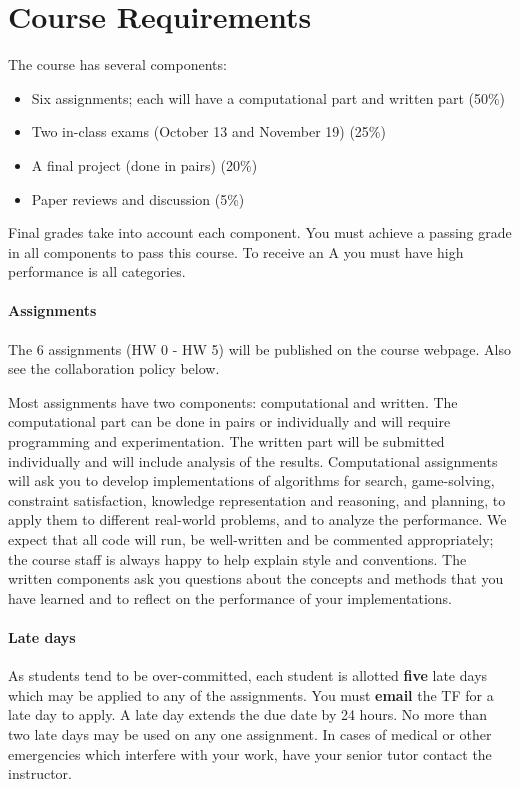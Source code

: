 \documentclass[11pt]{article}
\begin{document}
\vspace {0.25cm}
\section{Course Requirements}

The course has several components:

\begin{itemize}
\item Six assignments; each will have a computational part and written part (50\%)
\item Two in-class exams (October 13 and November 19) (25\%)
\item A final project (done in pairs) (20\%)
\item Paper reviews and discussion (5\%)
\end{itemize}


\noindent Final grades take into account each component. You must achieve a passing grade in all components to pass this course. To receive an A you must have high performance is all categories.

\paragraph{Assignments}

The 6 assignments (HW 0 - HW 5) will be published on the course
webpage. Also see the collaboration policy below.

Most assignments have two components: computational and written. The
computational part can be done in pairs or individually and will
require programming and experimentation. The written part will be
submitted individually and will include analysis of the results.
Computational assignments will ask you to develop implementations of
algorithms for search, game-solving, constraint satisfaction,
knowledge representation and reasoning, and planning, to apply them to
different real-world problems, and to analyze the performance. We
expect that all code will run, be well-written and be commented
appropriately; the course staff is always happy to help explain style
and conventions.  The written components ask you questions about the
concepts and methods that you have learned and to reflect on the
performance of your implementations.

\paragraph{Late days} As students tend to be over-committed, each
student is allotted \textbf{five} late days which may be applied to
any of the assignments.  You must \textbf{email} the TF for a late day
to apply. A late day extends the due date by 24 hours. No more than
two late days may be used on any one assignment. In cases of medical
or other emergencies which interfere with your work, have your senior
tutor contact the instructor. 
\end{document}
